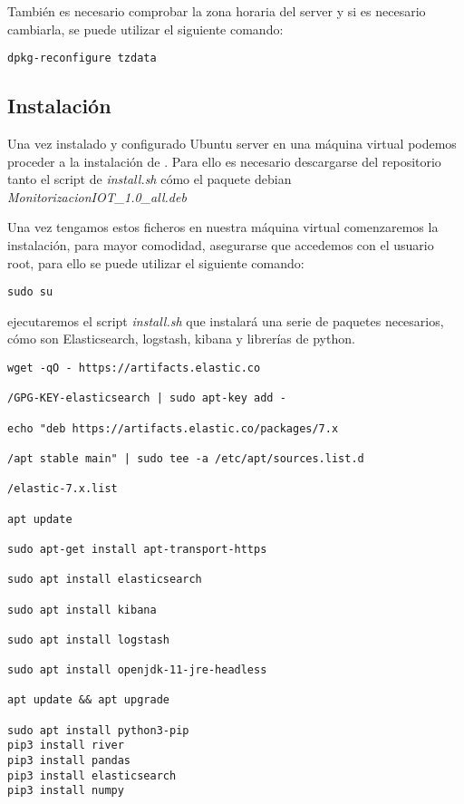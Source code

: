 También es necesario comprobar la zona horaria del server y si es necesario cambiarla, se puede utilizar el siguiente comando:


\begin{lstlisting}[frame=single] 
dpkg-reconfigure tzdata
\end{lstlisting}

\subsection{Instalación \nombrePrograma}

Una vez instalado y configurado Ubuntu server en una máquina virtual podemos proceder a la instalación de \nombrePrograma. Para ello es necesario descargarse del repositorio tanto el script de \textit{install.sh} cómo el paquete debian \textit{MonitorizacionIOT\_1.0\_all.deb}

Una vez tengamos estos ficheros en nuestra máquina virtual comenzaremos la instalación, para mayor comodidad, asegurarse que accedemos con el usuario root, para ello se puede utilizar el siguiente comando:

\begin{lstlisting}[frame=single] 
sudo su
\end{lstlisting}

ejecutaremos el script \textit{install.sh} que instalará una serie de paquetes necesarios, cómo son Elasticsearch, logstash, kibana y librerías de python. 

\begin{lstlisting}[frame=single] 
wget -qO - https://artifacts.elastic.co

/GPG-KEY-elasticsearch | sudo apt-key add -

echo "deb https://artifacts.elastic.co/packages/7.x

/apt stable main" | sudo tee -a /etc/apt/sources.list.d

/elastic-7.x.list

apt update

sudo apt-get install apt-transport-https

sudo apt install elasticsearch

sudo apt install kibana

sudo apt install logstash

sudo apt install openjdk-11-jre-headless

apt update && apt upgrade

sudo apt install python3-pip
pip3 install river
pip3 install pandas
pip3 install elasticsearch
pip3 install numpy
\end{lstlisting}
 

